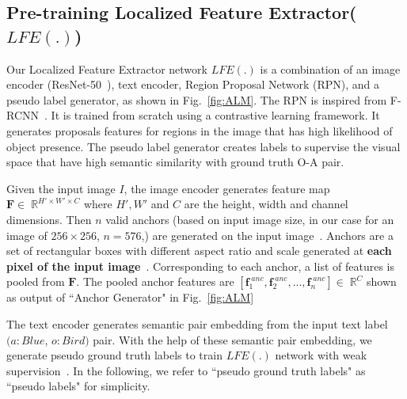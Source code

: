 \documentclass{bmvc2k}
\begin{document}
\vspace{-0.3cm}
\subsection{Pre-training Localized Feature Extractor($LFE(.)$)}\label{section:LFE}
\vspace{-0.2cm}
Our Localized Feature Extractor network $LFE(.)$ is a combination of an image encoder (ResNet-50~\cite{he2016deep}), text encoder, Region Proposal Network (RPN), and a pseudo label generator, as shown in Fig.~\ref{fig:ALM}. 
The RPN is inspired from F-RCNN~\cite{ren2015faster}. It is trained from scratch using a contrastive learning framework.
It generates proposals features for regions in the image that has high likelihood of object presence.
The pseudo label generator creates labels to supervise the visual space that have high semantic similarity with ground truth O-A pair.


Given the input image $I$, the image encoder generates feature map $\textbf{F} \in \; \mathbb{R}^{H'\times W'\times C}$ where $H', W'$ and $C$ are the height, width and channel dimensions. Then $n$ valid anchors (based on input image size, in our case for an image of $256 \times 256$, $n=576$,) are generated on the input image~\cite{ren2015faster}. Anchors are a set of rectangular boxes with different aspect ratio and scale generated at \textbf{each pixel of the input image}~\cite{ren2015faster}. Corresponding to each anchor, a list of features is pooled from $\textbf{F}$. The pooled anchor features are $[\textbf{f}^{\;anc}_1, \textbf{f}^{\;anc}_2, ..., \textbf{f}^{\;anc}_n]  \in \; \mathbb{R}^{C}$ shown as output of ``Anchor Generator" in Fig.~\ref{fig:ALM}

The text encoder generates semantic pair embedding from the input text label $(a:Blue$, $o:Bird)$ pair. With the help of these semantic pair embedding, we generate pseudo ground truth labels to train $LFE(.)$ network with weak supervision~\cite{tian2019contrastive}. In the following, we refer to ``pseudo ground truth labels" as ``pseudo labels" for simplicity.

\vspace{-0.35cm}
\end{document}
